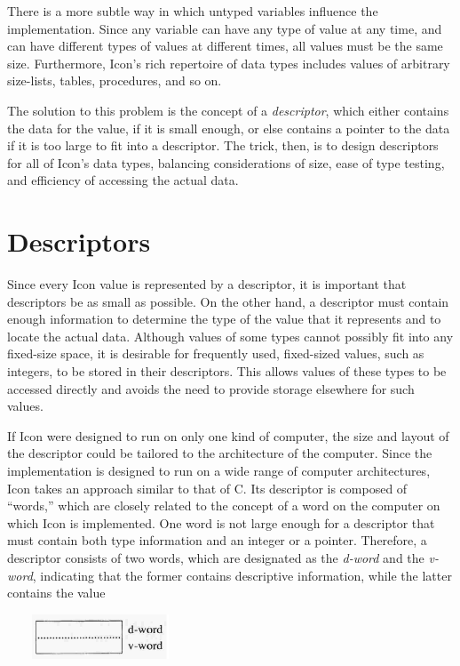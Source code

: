 There is a more subtle way in which untyped variables influence the
implementation. Since any variable can have any type of value at any
time, and can have different types of values at different times, all
values must be the same size.  Furthermore, Icon's rich repertoire of
data types includes values of arbitrary size-lists, tables,
procedures, and so on.

The solution to this problem is the concept of a \textit{descriptor},
which either contains the data for the value, if it is small enough,
or else contains a pointer to the data if it is too large to fit into
a descriptor. The trick, then, is to design descriptors for all of
Icon's data types, balancing considerations of size, ease of type
testing, and efficiency of accessing the actual data.


\section{Descriptors}

Since every Icon value is represented by a descriptor, it is important
that descriptors be as small as possible. On the other hand, a
descriptor must contain enough information to determine the type of
the value that it represents and to locate the actual data. Although
values of some types cannot possibly fit into any fixed-size space, it
is desirable for frequently used, fixed-sized values, such as
integers, to be stored in their descriptors. This allows values of
these types to be accessed directly and avoids the need to provide
storage elsewhere for such values.

If Icon were designed to run on only one kind of computer, the size
and layout of the descriptor could be tailored to the architecture of
the computer. Since the implementation is designed to run on a wide
range of computer architectures, Icon takes an approach similar to
that of C. Its descriptor is composed of ``words,'' which are closely
related to the concept of a word on the computer on which Icon is
implemented. One word is not large enough for a descriptor that must
contain both type information and an integer or a pointer. Therefore,
a descriptor consists of two words, which are designated as the
\textit{d-word} and the \textit{v-word}, indicating that the former
contains descriptive information, while the latter contains the value


\ \ \ \  \includegraphics[width=1.602in,height=0.5201in]{ib-img/ib-img005.jpg} 


